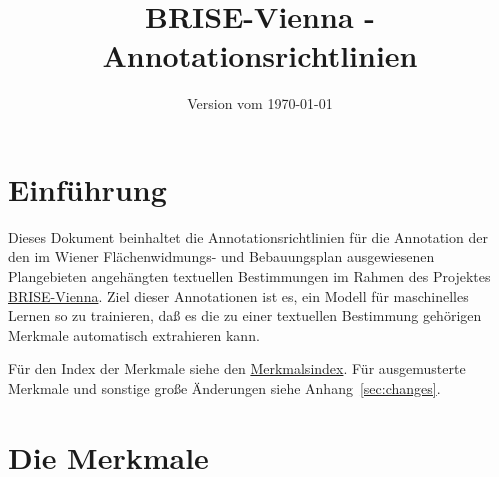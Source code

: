 \documentclass{article}
\begin{document}
\title{BRISE-Vienna - Annotationsrichtlinien}
\date{Version vom \today}
\maketitle


\pagestyle{fancy}




\section{Einführung}
\label{sec:einfuhrung}

Dieses Dokument beinhaltet die Annotationsrichtlinien für die
Annotation der den im Wiener Flächen\-wid\-mungs- und Bebauungsplan
ausgewiesenen Plangebieten angehängten textuellen Bestimmungen im
Rahmen des Projektes
\href{https://digitales.wien.gv.at/site/projekt/brisevienna/}{BRISE-Vienna}. Ziel
dieser Annotationen ist es, ein Modell für maschinelles Lernen so zu trainieren,
daß es die zu einer textuellen Bestimmung gehörigen Merkmale
automatisch extrahieren kann.

Für den Index der Merkmale siehe den
\hyperref[index]{Merkmalsindex}. Für ausgemusterte Merkmale und
sonstige große Änderungen siehe Anhang~\ref{sec:changes}.


\section{Die %
  Merkmale}
\label{sec:merkmalsliste}
\end{document}
